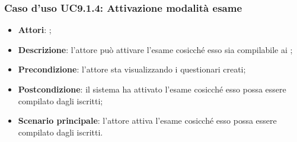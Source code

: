 		\subsubsection{Caso d'uso UC9.1.4: Attivazione modalità esame}
		\label{UC9.1.4}
		\begin{itemize}
			\item \textbf{Attori}: \uaupro{};
			\item \textbf{Descrizione}: l'attore può attivare l'esame cosicché esso sia compilabile ai \uaus{};
			\item \textbf{Precondizione}: l'attore sta visualizzando i questionari creati;
			\item \textbf{Postcondizione}: il sistema ha attivato l'esame cosicché esso possa essere compilato dagli \uaus{} iscritti;
			\item \textbf{Scenario principale}: l'attore attiva l'esame cosicché esso possa essere compilato dagli \uaus{} iscritti.
		\end{itemize}
										
